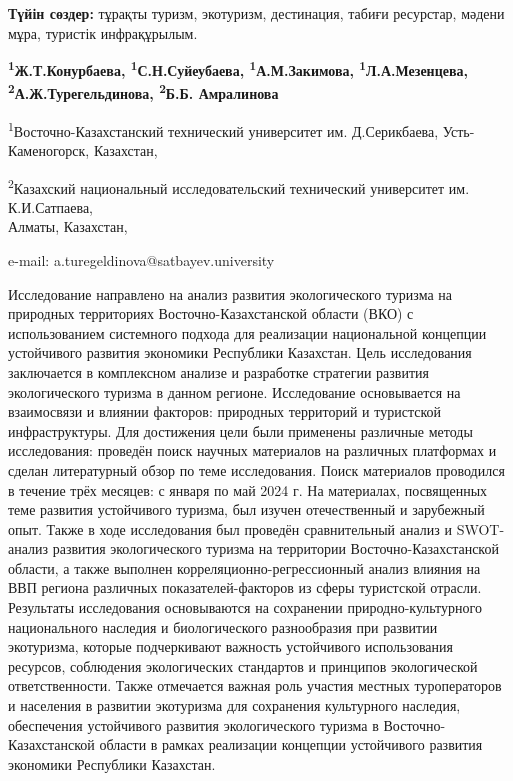 {\bfseries Түйін сөздер:} тұрақты туризм, экотуризм, дестинация, табиғи
ресурстар, мәдени мұра, туристік инфрақұрылым.


\begin{center}
{\bfseries \textsuperscript{1}Ж.Т.Конурбаева,
\textsuperscript{1}С.Н.Суйеубаева, \textsuperscript{1}А.М.Закимова,
\textsuperscript{1}Л.А.Мезенцева,\\
\textsuperscript{2}А.Ж.Турегельдинова\envelope,
\textsuperscript{2}Б.Б. Амралинова}

\textsuperscript{1}Восточно-Казахстанский технический университет им.
Д.Серикбаева, Усть-Каменогорск, Казахстан,

\textsuperscript{2}Казахский национальный исследовательский технический
университет им. К.И.Сатпаева,\\
Алматы, Казахстан,

e-mail: a.turegeldinova@satbayev.university
\end{center}

Исследование направлено на анализ развития экологического туризма на
природных территориях Восточно-Казахстанской области (ВКО) с
использованием системного подхода для реализации национальной концепции
устойчивого развития экономики Республики Казахстан. Цель исследования
заключается в комплексном анализе и разработке стратегии развития
экологического туризма в данном регионе. Исследование основывается на
взаимосвязи и влиянии факторов: природных территорий и туристской
инфраструктуры. Для достижения цели были применены различные методы
исследования: проведён поиск научных материалов на различных платформах
и сделан литературный обзор по теме исследования. Поиск материалов
проводился в течение трёх месяцев: с января по май 2024 г. На
материалах, посвященных теме развития устойчивого туризма, был изучен
отечественный и зарубежный опыт. Также в ходе исследования был проведён
сравнительный анализ и SWOT-анализ развития экологического туризма на
территории Восточно-Казахстанской области, а также выполнен
корреляционно-регрессионный анализ влияния на ВВП региона различных
показателей-факторов из сферы туристской отрасли. Результаты
исследования основываются на сохранении природно-культурного
национального наследия и биологического разнообразия при развитии
экотуризма, которые подчеркивают важность устойчивого использования
ресурсов, соблюдения экологических стандартов и принципов экологической
ответственности. Также отмечается важная роль участия местных
туроператоров и населения в развитии экотуризма для сохранения
культурного наследия, обеспечения устойчивого развития экологического
туризма в Восточно-Казахстанской области в рамках реализации концепции
устойчивого развития экономики Республики Казахстан.

